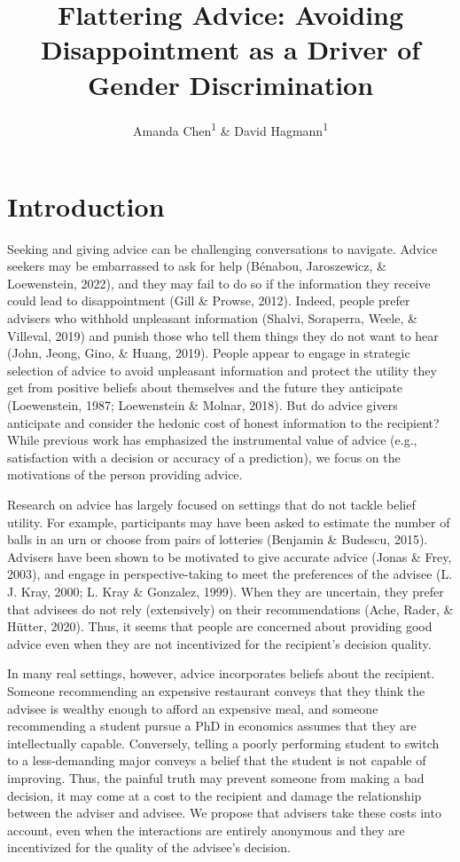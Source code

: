 \documentclass[
  man,floatsintext]{apa6}
\title{Flattering Advice: Avoiding Disappointment as a Driver of Gender Discrimination}
\author{Amanda Chen\textsuperscript{1} \& David Hagmann\textsuperscript{1}}
\date{}
\affiliation{\vspace{0.5cm}\textsuperscript{1} The Hong Kong University of Science and Technology}
\begin{document}
\maketitle

\hypertarget{introduction}{%
\section{Introduction}\label{introduction}}

Seeking and giving advice can be challenging conversations to navigate. Advice seekers may be embarrassed to ask for help (Bénabou, Jaroszewicz, \& Loewenstein, 2022), and they may fail to do so if the information they receive could lead to disappointment (Gill \& Prowse, 2012). Indeed, people prefer advisers who withhold unpleasant information (Shalvi, Soraperra, Weele, \& Villeval, 2019) and punish those who tell them things they do not want to hear (John, Jeong, Gino, \& Huang, 2019). People appear to engage in strategic selection of advice to avoid unpleasant information and protect the utility they get from positive beliefs about themselves and the future they anticipate (Loewenstein, 1987; Loewenstein \& Molnar, 2018). But do advice givers anticipate and consider the hedonic cost of honest information to the recipient? While previous work has emphasized the instrumental value of advice (e.g., satisfaction with a decision or accuracy of a prediction), we focus on the motivations of the person providing advice.

Research on advice has largely focused on settings that do not tackle belief utility. For example, participants may have been asked to estimate the number of balls in an urn or choose from pairs of lotteries (Benjamin \& Budescu, 2015). Advisers have been shown to be motivated to give accurate advice (Jonas \& Frey, 2003), and engage in perspective-taking to meet the preferences of the advisee (L. J. Kray, 2000; L. Kray \& Gonzalez, 1999). When they are uncertain, they prefer that advisees do not rely (extensively) on their recommendations (Ache, Rader, \& Hütter, 2020). Thus, it seems that people are concerned about providing good advice even when they are not incentivized for the recipient's decision quality.

In many real settings, however, advice incorporates beliefs about the recipient. Someone recommending an expensive restaurant conveys that they think the advisee is wealthy enough to afford an expensive meal, and someone recommending a student pursue a PhD in economics assumes that they are intellectually capable. Conversely, telling a poorly performing student to switch to a less-demanding major conveys a belief that the student is not capable of improving. Thus, the painful truth may prevent someone from making a bad decision, it may come at a cost to the recipient and damage the relationship between the adviser and advisee. We propose that advisers take these costs into account, even when the interactions are entirely anonymous and they are incentivized for the quality of the advisee's decision.
\end{document}

